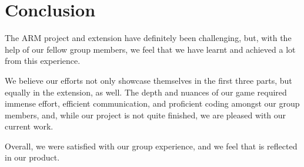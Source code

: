 \documentclass[11pt]{article}
\begin{document}
\section{Conclusion}


The ARM project and extension have definitely been challenging, but, with the help of our fellow group members, we feel that we have learnt and achieved a lot from this experience.

We believe our efforts not only showcase themselves in the first three parts, but equally in the extension, as well. The depth and nuances of our game required immense effort, efficient communication, and proficient coding amongst our group members, and, while our project is not quite finished, we are pleased with our current work.

Overall, we were satisfied with our group experience, and we feel that is reflected in our product.
\end{document}
